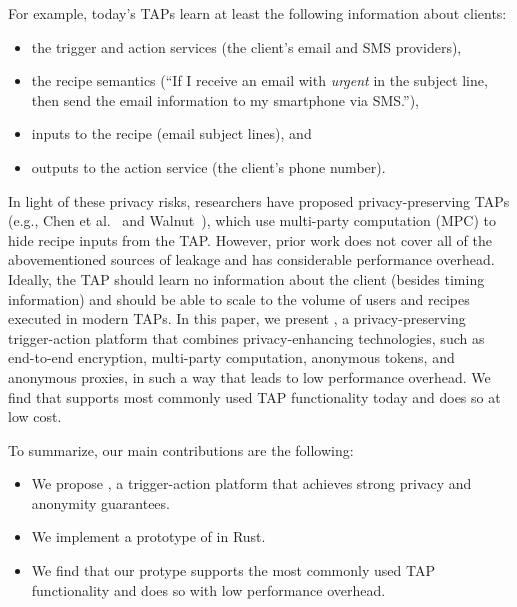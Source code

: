 For example, today's TAPs learn at least the following information about clients:
\begin{itemize}
  \item the trigger and action services (the client's email and SMS providers),
  \item the recipe semantics (``If I receive an email with \emph{urgent} in the
    subject line, then send the email information to my smartphone via SMS.''),
  \item inputs to the recipe (email subject lines), and
  \item outputs to the action service (the client's phone number).
\end{itemize}

In light of these privacy risks, researchers have proposed privacy-preserving
TAPs (e.g., Chen et al.~\cite{DBLP:conf/sp/ChenCWSCF21} and
Walnut~\cite{DBLP:journals/corr/abs-2009-12447}), which use multi-party
computation (MPC) to hide recipe inputs from the TAP. However, prior work does
not cover all of the abovementioned sources of leakage and has considerable
performance overhead. Ideally, the TAP should learn no information about the
client (besides timing information) and should be able to scale to the volume of
users and recipes executed in modern TAPs. In this paper, we present \sys, a
privacy-preserving trigger-action platform that combines privacy-enhancing
technologies, such as end-to-end encryption, multi-party computation, anonymous
tokens, and anonymous proxies, in such a way that leads to low performance
overhead. We find that \sys supports most commonly used TAP functionality today
and does so at low cost.

To summarize, our main contributions are the following:
\begin{itemize}
  \item We propose \sys, a trigger-action platform that achieves strong privacy
    and anonymity guarantees.
  \item We implement a prototype of \sys in Rust.
  \item We find that our \sys protype supports the most commonly used TAP
    functionality and does so with low performance overhead.
\end{itemize}
